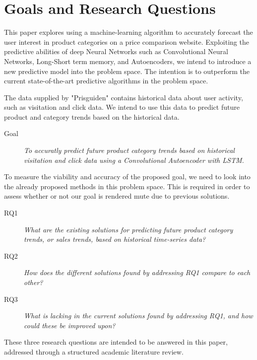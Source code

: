 \section{Goals and Research Questions}
\label{section:Introduction:Goal}

This paper explores using a machine-learning algorithm to accurately forecast the user interest in product categories on a price comparison website.
Exploiting the predictive abilities of deep Neural Networks such as Convolutional Neural Networks, Long-Short term memory, and Autoencoders,
we intend to introduce a new predictive model into the problem space.
The intention is to outperform the current state-of-the-art predictive algorithms in the problem space.

The data supplied by "Prisguiden" contains historical data about user activity, such as visitation and click data.
We intend to use this data to predict future product and category trends based on the historical data.

\begin{description}
    \item[Goal]{\it To accuratly predict future product category trends based on historical visitation and click data using a Convolutional Autoencoder with LSTM.}
\end{description}

To measure the viability and accuracy of the proposed goal, we need to look into the already proposed methods in this problem space.
This is required in order to assess whether or not our goal is rendered mute due to previous solutions.


\begin{description}
    \item[RQ1]{\it What are the existing solutions for predicting future product category trends, or sales trends, based on historical time-series data?}
\end{description}

\begin{description}
    \item[RQ2]{\it How does the different solutions found by addressing RQ1 compare to each other?}
\end{description}

\begin{description}
    \item[RQ3]{\it What is lacking in the current solutions found by addressing RQ1, and how could these be improved upon?}
\end{description}


These three research questions are intended to be answered in this paper, addressed through a structured academic literature review.

